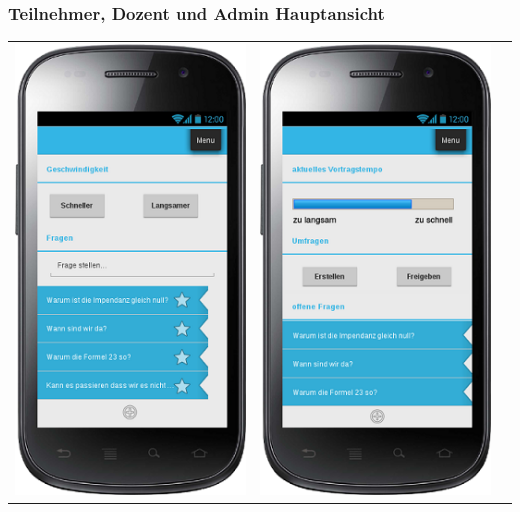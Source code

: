 \documentclass[german,a4paper]{beamer}
\begin{document}
\begin{frame}
\frametitle{Teilnehmer, Dozent und Admin Hauptansicht}
\begin{tabular}{ccc}
  \includegraphics[height=0.75\textheight]{./mockups/mockup_main_teilnehmer.png}
  &
  \includegraphics[height=0.75\textheight]{./mockups/mockup_main_dozent.png}

\end{tabular}
\end{frame}
\end{document}
